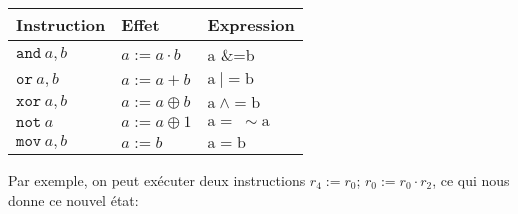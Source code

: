 \documentclass{article}
\begin{document}
\newcommand{\XOR}{\mathtt{xor}\:}
\newcommand{\OR}{\mathtt{or}\:}
\newcommand{\MOV}{\mathtt{mov}\:}
\newcommand{\AND}{\mathtt{and}\:}
\newcommand{\NOT}{\mathtt{not}\:}


\begin{center}
\begin{tabular}{|l|l|l|}
\hline
\multicolumn{1}{|l|}{Instruction}&	\multicolumn{1}{|l|}{Effet}&	\multicolumn{1}{|l|}{Expression}	\\
\hline
\multicolumn{1}{|l|}{$\AND a, b$}&	\multicolumn{1}{|l|}{ $a:=a\cdot b$}&	\multicolumn{1}{|l|}{ $\mathrm{a}$ \&=b}	\\
\hline
\multicolumn{1}{|l|}{$\OR a, b$}&	\multicolumn{1}{|l|}{ $a:=a+b$}&	\multicolumn{1}{|l|}{ $\mathrm{a}\ |=\mathrm{b}$}	\\
\hline
\multicolumn{1}{|l|}{$\XOR a, b$}&	\multicolumn{1}{|l|}{ $a:=a\oplus b$}&	\multicolumn{1}{|l|}{ $\mathrm{a}\ \wedge=\mathrm{b}$}	\\
\hline
\multicolumn{1}{|l|}{$\NOT a$}&	\multicolumn{1}{|l|}{$a:=a\oplus 1$}&	\multicolumn{1}{|l|}{ $\mathrm{a}=\ \sim \mathrm{a}$}	\\
\hline
\multicolumn{1}{|l|}{$\MOV a, b$}&	\multicolumn{1}{|l|}{ $a:=b$}&	\multicolumn{1}{|l|}{ $\mathrm{a}=\mathrm{b}$}	\\
\hline
\end{tabular}
\end{center}
\medbreak
Par exemple, on peut exécuter deux instructions $r_{4} := r_{0}$; $r_{0} :=r_{0}\cdot r_{2}$, ce qui nous donne ce nouvel état:
\medbreak
\end{document}

